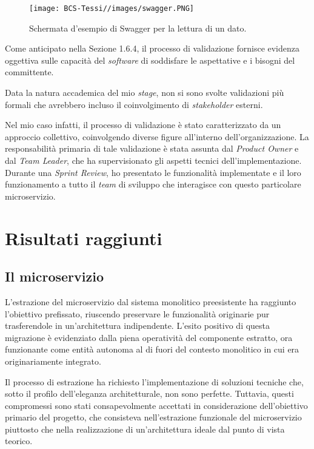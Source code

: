         \begin{figure}[H]
            \centering
            \texttt{[image: BCS-Tessi//images/swagger.PNG]}
            \caption{Schermata d'esempio di Swagger per la lettura di un dato.}
            \label{fig:swagger}
        \end{figure}

        \vspace{0.2 em}
        \noindent Come anticipato nella Sezione 1.6.4, il processo di validazione fornisce evidenza oggettiva sulle capacità del \textit{software} di soddisfare le aspettative e i bisogni del committente. 

        \vspace{0.2 em}
        \noindent Data la natura accademica del mio \textit{stage}, non si sono svolte validazioni più formali che avrebbero incluso il coinvolgimento di \textit{stakeholder} esterni.

        \vspace{0.2 em}
        \noindent Nel mio caso infatti, il processo di validazione è stato caratterizzato da un approccio collettivo, coinvolgendo diverse figure all'interno dell'organizzazione. La responsabilità primaria di tale validazione è stata assunta dal \textit{Product Owner} e dal \textit{Team Leader}, che ha supervisionato gli aspetti tecnici dell'implementazione. Durante una \textit{Sprint Review}, ho presentato le funzionalità implementate e il loro funzionamento a tutto il \textit{team} di sviluppo che interagisce con questo particolare microservizio.


    \section{Risultati raggiunti}
        \subsection{Il microservizio}
        L'estrazione del microservizio dal sistema monolitico preesistente ha raggiunto l'obiettivo prefissato, riuscendo preservare le funzionalità originarie pur trasferendole in un'architettura indipendente. L'esito positivo di questa migrazione è evidenziato dalla piena operatività del componente estratto, ora funzionante come entità autonoma al di fuori del contesto monolitico in cui era originariamente integrato.

        \vspace{0.2 em}
        \noindent Il processo di estrazione ha richiesto l'implementazione di soluzioni tecniche che, sotto il profilo dell'eleganza architetturale, non sono perfette. Tuttavia, questi compromessi sono stati consapevolmente accettati in considerazione dell'obiettivo primario del progetto, che consisteva nell'estrazione funzionale del microservizio piuttosto che nella realizzazione di un'architettura ideale dal punto di vista teorico.

